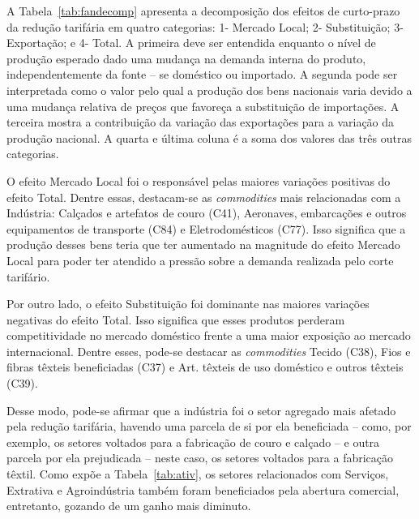 A Tabela~\ref{tab:fandecomp} apresenta a decomposição dos efeitos de curto-prazo da redução tarifária em quatro categorias: 1- Mercado Local; 2- Substituição; 3- Exportação; e 4- Total. A primeira deve ser entendida enquanto o nível de produção esperado dado uma mudança na demanda interna do produto, independentemente da fonte -- se doméstico ou importado. A segunda pode ser interpretada como o valor pelo qual a produção dos bens nacionais varia devido a uma mudança relativa de preços que favoreça a substituição de importações. A terceira mostra a contribuição da variação das exportações para a variação da produção nacional. A quarta e última coluna é a soma dos valores das três outras categorias.

O efeito Mercado Local foi o responsável pelas maiores variações positivas do efeito Total. Dentre essas, destacam-se as \textit{commodities} mais relacionadas com a Indústria: Calçados e artefatos de couro (C41), Aeronaves, embarcações e outros equipamentos de transporte (C84) e Eletrodomésticos (C77). Isso significa que a produção desses bens teria que ter aumentado na magnitude do efeito Mercado Local para poder ter atendido a pressão sobre a demanda realizada pelo corte tarifário.

Por outro lado, o efeito Substituição foi dominante nas maiores variações negativas do efeito Total. Isso significa que esses produtos perderam competitividade no mercado doméstico frente a uma maior exposição ao mercado internacional. Dentre esses, pode-se destacar as \textit{commodities} Tecido (C38), Fios e fibras têxteis beneficiadas (C37) e Art. têxteis de uso doméstico e outros têxteis (C39).

Desse modo, pode-se afirmar que a indústria foi o setor agregado mais afetado pela redução tarifária, havendo uma parcela de si por ela beneficiada -- como, por exemplo, os setores voltados para a fabricação de couro e calçado -- e outra parcela por ela prejudicada -- neste caso, os setores voltados para a fabricação têxtil. Como expõe a Tabela~\ref{tab:ativ}, os setores relacionados com Serviços, Extrativa e Agroindústria também foram beneficiados pela abertura comercial, entretanto, gozando de um ganho mais diminuto.


